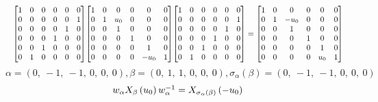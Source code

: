 \documentclass[11pt]{article}
\theoremstyle{definition}
\begin{document}
\[
\scaletoalign{\textwidth}{{\left[\begin{matrix}1 & 0 & 0 & 0 & 0 & 0\\0 & 0 & 0 & 0 & 0 & 1\\0 & 0 & 0 & 0 & 1 & 0\\0 & 0 & 0 & 1 & 0 & 0\\0 & 0 & 1 & 0 & 0 & 0\\0 & 1 & 0 & 0 & 0 & 0\end{matrix}\right]} {\left[\begin{matrix}1 & 0 & 0 & 0 & 0 & 0\\0 & 1 & u_{0} & 0 & 0 & 0\\0 & 0 & 1 & 0 & 0 & 0\\0 & 0 & 0 & 1 & 0 & 0\\0 & 0 & 0 & 0 & 1 & 0\\0 & 0 & 0 & 0 & - u_{0} & 1\end{matrix}\right]} {\left[\begin{matrix}1 & 0 & 0 & 0 & 0 & 0\\0 & 0 & 0 & 0 & 0 & 1\\0 & 0 & 0 & 0 & 1 & 0\\0 & 0 & 0 & 1 & 0 & 0\\0 & 0 & 1 & 0 & 0 & 0\\0 & 1 & 0 & 0 & 0 & 0\end{matrix}\right]} = {\left[\begin{matrix}1 & 0 & 0 & 0 & 0 & 0\\0 & 1 & - u_{0} & 0 & 0 & 0\\0 & 0 & 1 & 0 & 0 & 0\\0 & 0 & 0 & 1 & 0 & 0\\0 & 0 & 0 & 0 & 1 & 0\\0 & 0 & 0 & 0 & u_{0} & 1\end{matrix}\right]}}
\]
\[
\alpha = \left( 0, \  -1, \  -1, \  0, \  0, \  0\right), \beta = \left( 0, \  1, \  1, \  0, \  0, \  0\right), \sigma_{\alpha}(\beta) = \left( 0, \  -1, \  -1, \  0, \  0, \  0\right)
\]
\[
\scaletoalign{\textwidth}{w_{\alpha} X_{\beta}\left(u_{0}\right) w_{\alpha}^{-1} = X_{\sigma_{\alpha}\left(\beta\right)}\left(- u_{0}\right)}
\]
\end{document}
